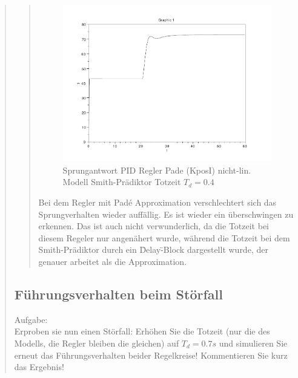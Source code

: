 \begin{quote}
    
    \begin{quote}
        \begin{figure}[H]
        \centering
            \includegraphics[scale=0.7, trim = 0cm 0cm 0cm 0cm, clip]{./Bilder/4_4_Td_04}
                \caption{Sprungantwort PID Regler Pade (KposI) nicht-lin. Modell Smith-Prädiktor Totzeit $T_d = 0.4$}
        \end{figure}
        
        Bei dem Regler mit Pad\'e Approximation verschlechtert sich das Sprungverhalten wieder auffällig. Es ist wieder
        ein überschwingen zu erkennen. Das ist auch nicht verwunderlich, da die Totzeit bei diesem Regeler nur
        angenähert wurde, während die Totzeit bei dem Smith-Prädiktor durch ein \"Delay\"-Block dargestellt wurde, der
        genauer arbeitet als die Approximation.
        
    \end{quote}
    
    
    \subsection{Führungsverhalten beim Störfall}
    Aufgabe:\\
    Erproben sie nun einen Störfall: Erhöhen Sie die Totzeit (nur die des Modells, die Regler bleiben die gleichen)
    auf $T_d = 0.7s$ und simulieren Sie erneut das Führungsverhalten beider Regelkreise! Kommentieren Sie kurz das
    Ergebnis!\vspace{1em}
    
    \begin{quote}
 

\end{quote}
\end{quote}
